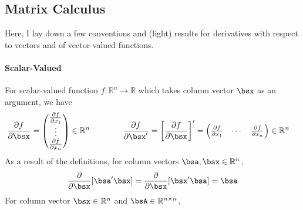 \documentclass[12pt]{article}
\theoremstyle{plain}
\theoremstyle{definition}
\theoremstyle{remark}
\newcommand{\Rn}{\mathbb{R}^n}
\newcommand{\Rnn}{\mathbb{R}^{n\times n}}
\begin{document}
\subsection{Matrix Calculus}

Here, I lay down a few conventions and (light) results for derivatives
with respect to vectors and of vector-valued functions.

\paragraph{Scalar-Valued}
For scalar-valued function $f: \mathbb{R}^n \rightarrow \mathbb{R}$
which takes column vector $\bsx$ as an argument, we have
\begin{align*}
  \frac{\partial f}{\partial \bsx}
  &=
  \begin{pmatrix}
    \frac{\partial f}{\partial x_1} \\
    \vdots\\
    \frac{\partial f}{\partial x_n} \\
    \end{pmatrix} \in \mathbb{R}^n
  \qquad
  \qquad
  \frac{\partial f}{\partial \bsx'}
  =
  \left[
  \frac{\partial f}{\partial \bsx}
  \right]'
  =
  \begin{pmatrix}
    \frac{\partial f}{\partial x_1} &
    \cdots&
    \frac{\partial f}{\partial x_n}
  \end{pmatrix}\in \mathbb{R}^n
\end{align*}
As a result of the definitions, for column vectors $\bsa,\bsx\in \Rn$,
\begin{align*}
  \frac{\partial}{\partial \bsx}
  [\bsa'\bsx]
  =
  \frac{\partial}{\partial \bsx}
  [\bsx'\bsa]
  = \bsa
\end{align*}
For column vector $\bsx\in \Rn$ and $\bsA\in\Rnn$,
\end{document}
